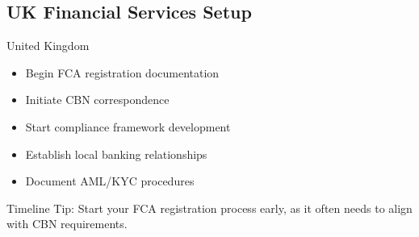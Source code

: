 \subsection{UK Financial Services Setup}\label{subsec:uk-setup}
\begin{regionalbox}{United Kingdom}
\begin{itemize}
    \item Begin FCA registration documentation
    \item Initiate CBN correspondence
    \item Start compliance framework development
    \item Establish local banking relationships
    \item Document AML/KYC procedures
\end{itemize}

Timeline Tip: Start your FCA registration process early, as it often needs to align with CBN requirements.

%

\end{regionalbox}
